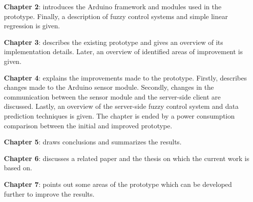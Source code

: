
\noindent \textbf{Chapter 2}: introduces the Arduino framework and modules used in the prototype. Finally, a description of fuzzy control systems and simple linear regression is given.
\newline

\noindent \textbf{Chapter 3}: describes the existing prototype and gives an overview of its implementation details. Later, an overview of identified areas of improvement is given.
\newline

\noindent \textbf{Chapter 4}: explains the improvements made to the prototype. Firstly, describes changes made to the Arduino sensor module. Secondly, changes in the communication between the sensor module and the server-side client are discussed. Lastly, an overview of the server-side fuzzy control system and data prediction techniques is given. The chapter is ended by a power consumption comparison between the initial and improved prototype.
\newline

\noindent \textbf{Chapter 5}: draws conclusions and summarizes the results.
\newline

\noindent \textbf{Chapter 6}: discusses a related paper and the thesis on which the current work is based on.
\newline

\noindent \textbf{Chapter 7}: points out some areas of the prototype which can be developed further to improve the results.
\newline




